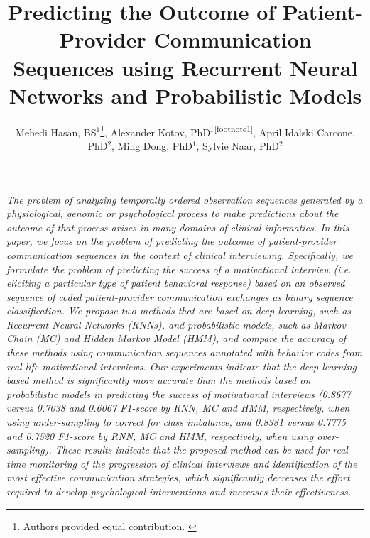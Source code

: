 \documentclass{amia_summit_2018}
\begin{document}
\title{Predicting the Outcome of Patient-Provider Communication Sequences using Recurrent Neural Networks and Probabilistic Models}

\author{Mehedi Hasan, BS$^{1}$\footnote[1]{Authors provided equal contribution. \label{footnote1}}, Alexander Kotov, PhD$^{1}$\textsuperscript{\ref{footnote1}}, April Idalski Carcone, PhD$^{2}$, Ming Dong, PhD$^{1}$, Sylvie Naar, PhD$^{2}$}


\maketitle

\textit{The problem of analyzing temporally ordered observation sequences generated by a physiological, genomic or psychological process to make predictions about the outcome of that process arises in
many domains of clinical informatics. In this paper, we focus on the problem of predicting the outcome of patient-provider communication sequences in the context of clinical interviewing.
Specifically, we formulate the problem of predicting the success of a motivational interview (i.e. eliciting a particular type of patient behavioral response) based on an observed sequence of
coded patient-provider communication exchanges as binary sequence classification.
We propose two methods that are based on deep learning, such as Recurrent Neural Networks (RNNs), and probabilistic models, such as Markov Chain (MC) and Hidden Markov Model (HMM), and compare the
accuracy of these methods using communication sequences annotated with behavior codes from real-life motivational interviews. Our experiments indicate that the deep learning-based method is
significantly more accurate than the methods based on probabilistic models in predicting the success of motivational interviews (0.8677 versus 0.7038 and 0.6067 F1-score by RNN, MC and HMM,
respectively, when using under-sampling to correct for class imbalance, and 0.8381 versus 0.7775 and 0.7520 F1-score by RNN, MC and HMM, respectively, when using over-sampling). These results indicate
that the proposed method can be used for real-time monitoring of the progression of clinical interviews and identification of the most effective communication strategies, which significantly decreases
the effort required to develop psychological interventions and increases their effectiveness.}
\end{document}
